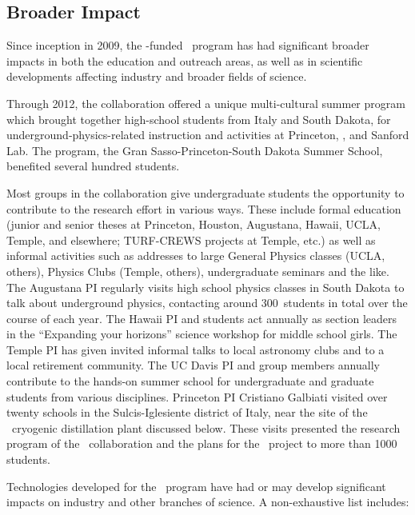 \subsection{Broader Impact}
\label{sec:PreviousResults-BroaderImpact}

Since inception in 2009, the \NSF-funded \DSs\ program has had significant broader impacts in both the education and outreach areas, as well as in scientific developments affecting industry and broader fields of science.  

Through 2012, the collaboration offered a unique multi-cultural summer program which brought together high-school students from Italy and South Dakota, for underground-physics-related instruction and activities at Princeton, \LNGS, and Sanford Lab.  The program, the Gran Sasso-Princeton-South Dakota Summer School, benefited several hundred students.

Most groups in the collaboration give undergraduate students the opportunity to contribute to the research effort in various ways.  These include formal education (junior and senior theses at Princeton, Houston, Augustana, Hawaii, UCLA, Temple, and elsewhere; TURF-CREWS projects at Temple, etc.) as well as informal activities such as addresses to large General Physics classes (UCLA, others), Physics Clubs (Temple, others),  undergraduate seminars and the like. The Augustana PI regularly visits high school physics classes in South Dakota to talk about underground physics, contacting around \num{300}~students in total over the course of each year.  The Hawaii PI and students act annually as section leaders in the ``Expanding your horizons'' science workshop for middle school girls.  The Temple PI has given invited informal talks to local astronomy clubs and to a local retirement community. The UC Davis PI and group members annually contribute to the hands-on summer school for undergraduate and graduate students from various disciplines. Princeton PI Cristiano Galbiati visited over twenty schools in the Sulcis-Iglesiente district of Italy, near the site of the \Aria\ cryogenic distillation plant discussed below.  These visits presented the research program of the \DSs\ collaboration and the plans for the \Aria\ project to more than \num{1000} students.

Technologies developed for the \DSs\ program have had or may develop significant impacts on industry and other branches of science.  A non-exhaustive list includes:

